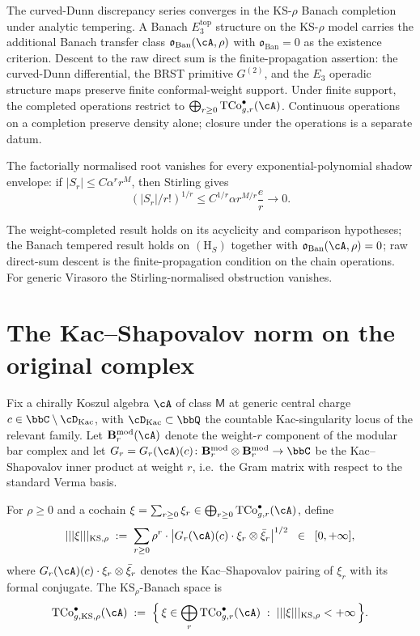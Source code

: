 The curved-Dunn discrepancy series converges in the KS-$\rho$ Banach
completion under analytic tempering. A Banach $E_3^{\mathrm{top}}$
structure on the KS-$\rho$ model carries the additional Banach transfer
class
$\mathfrak{o}_{\mathrm{Ban}}(\cA,\rho)$ with $\mathfrak{o}_{\mathrm{Ban}}=0$
as the existence criterion. Descent to the raw direct sum is the
finite-propagation assertion: the curved-Dunn differential, the BRST
primitive $G^{(2)}$, and the $E_3$ operadic structure maps preserve
finite conformal-weight support. Under finite support, the completed
operations restrict to
$\bigoplus_{r\ge0}\mathrm{TCo}^{\bullet}_{g,r}(\cA)$. Continuous
operations on a completion preserve density alone; closure under the
operations is a separate datum.

The factorially normalised root vanishes for every
exponential-polynomial shadow envelope: if $|S_r|\le C\alpha^r r^M$,
then Stirling gives
\[
 \left(|S_r|/r!\right)^{1/r}
 \le C^{1/r}\alpha r^{M/r}\frac{e}{r}
 \longrightarrow 0 .
\]

The weight-completed result holds on its acyclicity and comparison
hypotheses; the Banach tempered result holds on
$(\mathrm{H}_S)$ together with
$\mathfrak{o}_{\mathrm{Ban}}(\cA,\rho)=0$; raw direct-sum descent is
the finite-propagation condition on the chain operations. For generic
Virasoro the Stirling-normalised obstruction vanishes.

\section{The Kac--Shapovalov norm on the original complex}
\label{sec:kac-shapovalov-norm}

Fix a chirally Koszul algebra $\cA$ of class
$\mathsf{M}$ at generic central charge $c \in \bbC \setminus
\cD_{\mathrm{Kac}}$, with $\cD_{\mathrm{Kac}} \subset \bbQ$ the
countable Kac-singularity locus of the relevant family. Let
$\mathbf{B}^{\mathrm{mod}}_r(\cA)$ denote the weight-$r$ component
of the modular bar complex and let
$G_r = G_r(\cA)(c) \colon \mathbf{B}^{\mathrm{mod}}_r \otimes
\mathbf{B}^{\mathrm{mod}}_r \to \bbC$ be the Kac--Shapovalov inner
product at weight $r$, i.e.\ the Gram matrix with respect to the
standard Verma basis.

\begin{definition}
\label{def:kac-shapovalov-norm}
For $\rho \ge 0$ and a cochain
$\xi = \sum_{r \ge 0} \xi_r \in \bigoplus_{r \ge 0}
\mathrm{TCo}^{\bullet}_{g, r}(\cA)$, define
\[
 \lvert\lvert\lvert \xi \rvert\rvert\rvert_{\mathrm{KS}, \rho}
 \;:=\;
 \sum_{r \ge 0}
 \rho^r \cdot
 \bigl\lvert G_r(\cA)(c) \cdot \xi_r \otimes \bar\xi_r \bigr\rvert^{1/2}
 \;\;\in\;\;
 [0, + \infty],
\]
where $G_r(\cA)(c) \cdot \xi_r \otimes \bar\xi_r$ denotes the
Kac--Shapovalov pairing of $\xi_r$ with its formal conjugate. The
$\mathrm{KS}_\rho$-Banach space is
\[
 \mathrm{TCo}^{\bullet}_{g, \mathrm{KS}, \rho}(\cA)
 \;:=\;
 \Bigl\{\, \xi \in \bigoplus_r \mathrm{TCo}^{\bullet}_{g, r}(\cA)
 \;:\; \lvert\lvert\lvert \xi \rvert\rvert\rvert_{\mathrm{KS}, \rho}
 < + \infty \,\Bigr\}.
\]
\end{definition}


